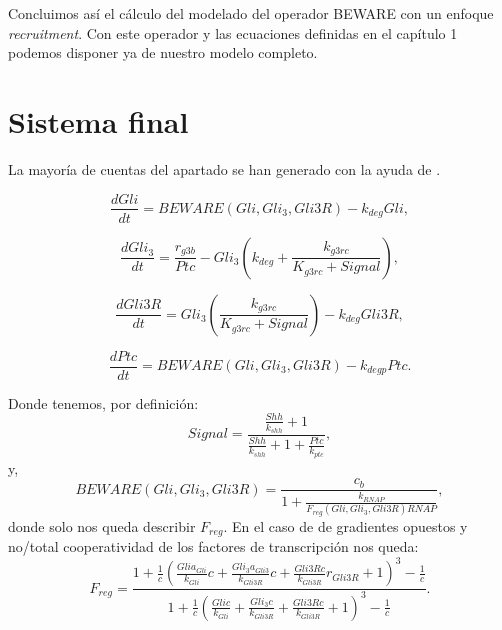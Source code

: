 Concluimos así el cálculo del modelado del operador BEWARE con un enfoque \textit{recruitment}. Con este operador y las ecuaciones definidas en el capítulo 1 podemos disponer ya de nuestro modelo completo.

\section{Sistema final}

La mayoría de cuentas del apartado se han generado con la ayuda de \cite{sympy}.

\begin{equation}
\frac{dGli}{dt} = BEWARE(Gli, Gli_3, Gli3R)-k_{deg}Gli,
\label{equ:12}
\end{equation}

\begin{equation}
\frac{dGli_3}{dt} = \frac{r_{g3b}}{Ptc}-Gli_3\left(k_{deg}+\frac{k_{g3rc}}{K_{g3rc}+Signal}\right),
\label{eq:22}
\end{equation}

\begin{equation}
\frac{dGli3R}{dt}= Gli_3\left(\frac{k_{g3rc}}{K_{g3rc}+Signal}\right)-k_{deg}Gli3R,
\label{eq:32}
\end{equation}

\begin{equation}
\frac{dPtc}{dt} = BEWARE(Gli, Gli_3, Gli3R)-k_{degp}Ptc.
\label{eq:42}
\end{equation}


Donde tenemos, por definición:
 \begin{equation}
Signal=\frac{\frac{Shh}{k_{shh}} + 1}{\frac{Shh}{k_{shh}} + 1 + \frac{Ptc}{k_{ptc}}},
\label{signal} \end{equation}
y,
\begin{equation}
BEWARE(Gli, Gli_3, Gli3R)=\frac{c_{b}}{1 + \frac{k_{RNAP}}{F_{reg}(Gli, Gli_3, Gli3R) RNAP}},
\end{equation}
donde solo nos queda describir $F_{reg}$. En el caso de de gradientes opuestos y no/total cooperatividad de los factores de transcripción nos queda:
\begin{equation}
F_{reg}=\frac{1 + \frac{1}{c} \left(\frac{Gli a_{Gli}}{k_{Gli}} c + \frac{Gli_{3} a_{Gli3}}{k_{Gli3R}} c + \frac{Gli3R c}{k_{Gli3R}} r_{Gli3R} + 1\right)^{3} - \frac{1}{c}}{1 + \frac{1}{c} \left(\frac{Gli c}{k_{Gli}} + \frac{Gli_{3} c}{k_{Gli3R}} + \frac{Gli3R c}{k_{Gli3R}} + 1\right)^{3} - \frac{1}{c}}.
\end{equation}

